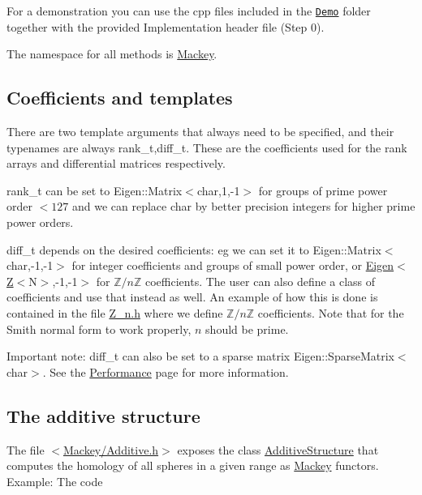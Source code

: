 For a demonstration you can use the cpp files included in the \href{https://github.com/NickG-Math/Mackey/tree/master/Demo}{\tt Demo} folder together with the provided Implementation header file (Step 0).

The namespace for all methods is {\ttfamily \hyperlink{namespaceMackey}{Mackey}}.\hypertarget{use_coeff}{}\subsection{Coefficients and templates}\label{use_coeff}
There are two template arguments that always need to be specified, and their typenames are always {\ttfamily rank\+\_\+t,diff\+\_\+t}. These are the coefficients used for the rank arrays and differential matrices respectively.


\begin{DoxyItemize}
\item {\ttfamily rank\+\_\+t} can be set to {\ttfamily Eigen\+::\+Matrix$<$char,1,-\/1$>$} for groups of prime power order $<127$ and we can replace {\ttfamily char} by better precision integers for higher prime power orders.
\item {\ttfamily diff\+\_\+t} depends on the desired coefficients\+: eg we can set it to {\ttfamily Eigen\+::\+Matrix$<$char,-\/1,-\/1$>$} for integer coefficients and groups of small power order, or {\ttfamily \hyperlink{namespaceEigen}{Eigen}$<$\hyperlink{classZ}{Z}$<$N$>$,-\/1,-\/1$>$} for $\mathbb Z/n\mathbb Z$ coefficients. The user can also define a class of coefficients and use that instead as well. An example of how this is done is contained in the file {\ttfamily \hyperlink{Z__n_8h}{Z\+\_\+n.\+h}} where we define $\mathbb Z/n\mathbb Z$ coefficients. Note that for the Smith normal form to work properly, $n$ should be prime.
\end{DoxyItemize}

Important note\+: {\ttfamily diff\+\_\+t} can also be set to a sparse matrix {\ttfamily Eigen\+::\+Sparse\+Matrix$<$char$>$}. See the \hyperlink{perf}{Performance} page for more information. \hypertarget{use_step1add}{}\subsection{The additive structure}\label{use_step1add}
The file {\ttfamily $<$\hyperlink{Additive_8h}{Mackey/\+Additive.\+h}$>$} exposes the class \hyperlink{classMackey_1_1AdditiveStructure}{Additive\+Structure} that computes the homology of all spheres in a given range as \hyperlink{namespaceMackey}{Mackey} functors. Example\+: The code

